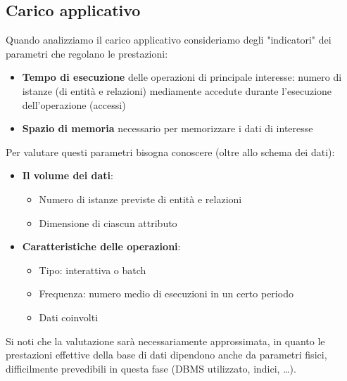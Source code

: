 \documentclass[12pt]{article}
\begin{document}
\subsection{Carico applicativo}
Quando analizziamo il carico applicativo consideriamo degli "indicatori" dei parametri che regolano le prestazioni:
\begin{itemize}
    \item \textbf{Tempo di esecuzione} delle operazioni di principale interesse: numero di istanze (di entità e relazioni) mediamente accedute durante l'esecuzione dell'operazione (accessi)
    \item \textbf{Spazio di memoria} necessario per memorizzare i dati di interesse
\end{itemize}
Per valutare questi parametri bisogna conoscere (oltre allo schema dei dati):
\begin{itemize}
    \item \textbf{Il volume dei dati}:
    \begin{itemize}
        \item Numero di istanze previste di entità e relazioni
        \item Dimensione di ciascun attributo
    \end{itemize}
    \item \textbf{Caratteristiche delle operazioni}:
    \begin{itemize}
        \item Tipo: interattiva o batch
        \item Frequenza: numero medio di esecuzioni in un certo periodo
        \item Dati coinvolti
    \end{itemize}
\end{itemize}
Si noti che la valutazione sarà necessariamente approssimata, in quanto le prestazioni effettive della base di dati dipendono anche da parametri fisici, difficilmente prevedibili in questa fase (DBMS utilizzato, indici, \dots).
\end{document}
